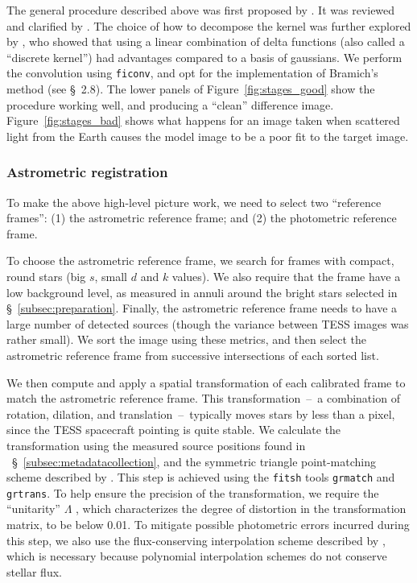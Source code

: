 \documentclass[12pt,twocolumn,tighten]{aastex62}
\begin{document}
The general procedure described above was first proposed by
\citet{Alard_Lupton_1998}.  It was reviewed and clarified by
\citet{miller_optimal_2008}.  The choice of how to decompose the
kernel was further explored by \citet{bramich_new_2008}, who showed
that using a linear combination of delta functions (also called a
``discrete kernel'') had advantages compared to a basis of gaussians.
We perform the convolution using \texttt{ficonv}, and opt for the
implementation of Bramich's method (see \citealt{Pal_2009} \S~2.8).
The lower panels of Figure~\ref{fig:stages_good} show the procedure
working well, and producing a ``clean'' difference image.
Figure~\ref{fig:stages_bad} shows what happens for an image taken when
scattered light from the Earth causes the model image to be a poor fit
to the target image.


\subsubsection{Astrometric registration}

To make the above high-level picture work, we need to select two
``reference frames'': (1) the astrometric reference frame; and (2) the
photometric reference frame.

To choose the astrometric reference frame, we search for frames with
compact, round stars (big $s$, small $d$ and $k$ values).  We also
require that the frame have a low background level, as measured in
annuli around the bright stars selected in
\S~\ref{subsec:preparation}.  Finally, the astrometric reference frame
needs to have a large number of detected sources (though the variance
between TESS images was rather small).  We sort the image using these
metrics, and then select the astrometric reference frame from
successive intersections of each sorted list.

We then compute and apply a spatial transformation of each calibrated
frame to match the astrometric reference frame.  This
transformation~--~a combination of rotation, dilation, and
translation~--~typically moves stars by less than a pixel, since the
TESS spacecraft pointing is quite stable.  We calculate the
transformation using the measured source positions found in
~\S~\ref{subsec:metadatacollection}, and the symmetric triangle
point-matching scheme described by \citet[][~\S~2.5.2]{Pal_2009}.
This step is achieved using the \texttt{fitsh} tools \texttt{grmatch}
and \texttt{grtrans}.  To help ensure the precision of the
transformation, we require the ``unitarity'' $\Lambda$
\citep[][~Eq.~54]{Pal_2009}, which characterizes the degree of
distortion in the transformation matrix, to be below 0.01.  To
mitigate possible photometric errors incurred during this step, we
also use the flux-conserving interpolation scheme described by
\citet{Pal_2009}, which is necessary because polynomial interpolation
schemes do not conserve stellar flux. 
\end{document}
